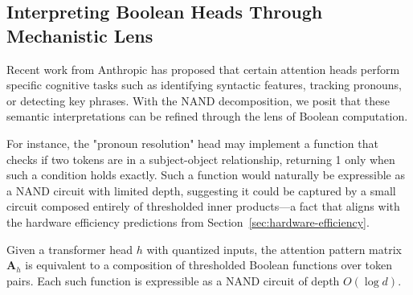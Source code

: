 \subsection{Interpreting Boolean Heads Through Mechanistic Lens}













Recent work from Anthropic has proposed that certain attention heads perform specific cognitive tasks such as identifying syntactic features, tracking pronouns, or detecting key phrases. With the NAND decomposition, we posit that these semantic interpretations can be refined through the lens of Boolean computation.













For instance, the "pronoun resolution" head may implement a function that checks if two tokens are in a subject-object relationship, returning 1 only when such a condition holds exactly. Such a function would naturally be expressible as a NAND circuit with limited depth, suggesting it could be captured by a small circuit composed entirely of thresholded inner products—a fact that aligns with the hardware efficiency predictions from Section~\ref{sec:hardware-efficiency}.













\begin{theorem}






\label{thm:head-threshold-decomp}






Given a transformer head $h$ with quantized inputs, the attention pattern matrix $\mathbf{A}_h$ is equivalent to a composition of thresholded Boolean functions over token pairs. Each such function is expressible as a NAND circuit of depth $O(\log d)$.






\end{theorem}













